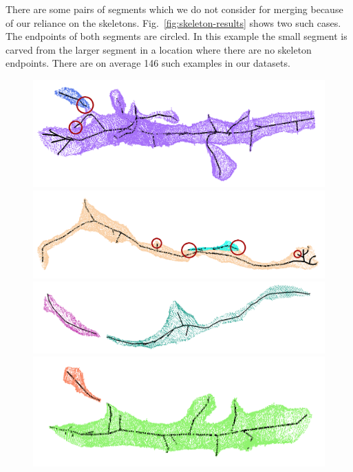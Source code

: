 There are some pairs of segments which we do not consider for merging because of our reliance on the skeletons.
Fig.~\ref{fig:skeleton-results} shows two such cases. 
The endpoints of both segments are circled.
In this example the small segment is carved from the larger segment in a location where there are no skeleton endpoints. 
There are on average 146 such examples in our datasets.

\begin{figure}[t!]
	\centering
	\begin{minipage}{0.45\linewidth}
		\includegraphics[width=\linewidth]{./figures/merge_candidate1.png}	
	\end{minipage}
	\hfill
	\begin{minipage}{0.45\linewidth}	
		\includegraphics[width=\linewidth]{./figures/merge_candidate2.png}
	\end{minipage}
	\begin{minipage}{0.45\linewidth}
		\includegraphics[width=\linewidth]{./figures/merge_candidate3.png}
	\end{minipage}
	\begin{minipage}{0.45\linewidth}
		\includegraphics[width=\linewidth]{./figures/merge_candidate4.png}

\end{minipage}
\end{figure}
